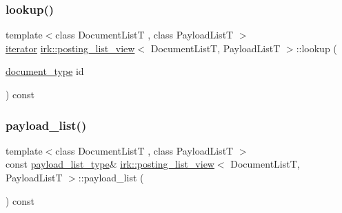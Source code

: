 \subsubsection{\texorpdfstring{lookup()}{lookup()}}
{\footnotesize\ttfamily template$<$class Document\+ListT , class Payload\+ListT $>$ \\
\mbox{\hyperlink{classirk_1_1posting__list__view_1_1iterator}{iterator}} \mbox{\hyperlink{classirk_1_1posting__list__view}{irk\+::posting\+\_\+list\+\_\+view}}$<$ Document\+ListT, Payload\+ListT $>$\+::lookup (\begin{DoxyParamCaption}\item[{\mbox{\hyperlink{classirk_1_1posting__list__view_ac4615e6e3d8ee1eb9a847b7a34919977}{document\+\_\+type}}}]{id }\end{DoxyParamCaption}) const\hspace{0.3cm}{\ttfamily [inline]}}

\mbox{\label{classirk_1_1posting__list__view_ade6e30ce4668d92223f1cebcb28d6bea}} 
\subsubsection{\texorpdfstring{payload\+\_\+list()}{payload\_list()}}
{\footnotesize\ttfamily template$<$class Document\+ListT , class Payload\+ListT $>$ \\
const \mbox{\hyperlink{classirk_1_1posting__list__view_aabf1afcb3a994971f30879354301e1fe}{payload\+\_\+list\+\_\+type}}\& \mbox{\hyperlink{classirk_1_1posting__list__view}{irk\+::posting\+\_\+list\+\_\+view}}$<$ Document\+ListT, Payload\+ListT $>$\+::payload\+\_\+list (\begin{DoxyParamCaption}{ }\end{DoxyParamCaption}) const\hspace{0.3cm}{\ttfamily [inline]}}

\mbox{\label{classirk_1_1posting__list__view_aad71ebe547caf256c8aab055c904ff19}} 
